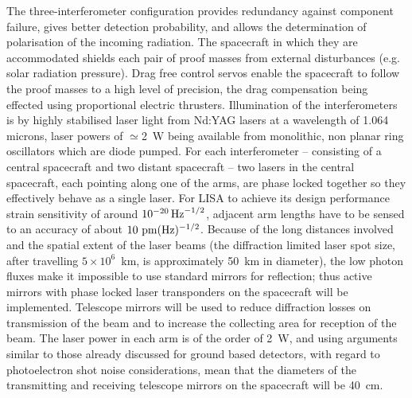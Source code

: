 \documentclass{article}
\begin{document}
The three-interferometer configuration provides redundancy against component
failure, gives better detection probability, and allows the determination of
polarisation of the incoming radiation. The spacecraft in which they are
accommodated shields each pair of proof masses from external disturbances (e.g.
solar radiation pressure). Drag free control servos enable the spacecraft to
follow the proof masses to a high level of precision, the drag compensation
being effected using proportional electric thrusters. Illumination of the
interferometers is by highly stabilised laser light from Nd:YAG lasers at a
wavelength of 1.064 microns, laser powers of $\simeq$2~W being available from
monolithic, non planar ring oscillators which are diode pumped. For each
interferometer -- consisting of a central spacecraft and two distant spacecraft
-- two lasers in the central spacecraft, each pointing along one of the arms,
are phase locked together so they effectively behave as a single laser. For LISA
to achieve its design performance strain sensitivity of around $10^{-20}\,{\rm
Hz}^{-1/2}$, adjacent arm lengths have to be sensed to an accuracy of about $10
{\rm \ pm}(\rm Hz)^{-1/2}$. Because of the long distances involved and the
spatial extent of the laser beams (the diffraction limited laser spot size,
after travelling $5\times10^{6}$~km, is approximately 50~km in diameter), the
low photon fluxes make it impossible to use standard mirrors for reflection;
thus active mirrors with phase locked laser transponders on the spacecraft will
be implemented. Telescope mirrors will be used to reduce diffraction losses on
transmission of the beam and to increase the collecting area for reception of
the beam. The laser power in each arm is of the order of 2~W, and using
arguments similar to those already discussed for ground based detectors, with
regard to photoelectron shot noise considerations, mean that the diameters of
the transmitting and receiving telescope mirrors on the spacecraft will be
40~cm.
\end{document}
